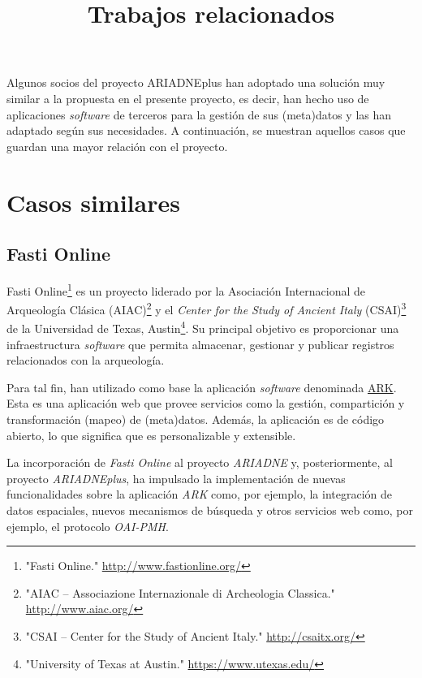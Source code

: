 \documentclass[
]{article}
\title{Trabajos relacionados}
\author{}
\date{}
\begin{document}
\maketitle

Algunos socios del proyecto ARIADNEplus han adoptado una solución muy
similar a la propuesta en el presente proyecto, es decir, han hecho uso
de aplicaciones \emph{software} de terceros para la gestión de sus
(meta)datos y las han adaptado según sus necesidades. A continuación, se
muestran aquellos casos que guardan una mayor relación con el proyecto.

\hypertarget{casos-similares}{%
\section{Casos similares}\label{casos-similares}}

\hypertarget{fasti-online}{%
\subsection{Fasti Online}\label{fasti-online}}

Fasti Online\footnote{"Fasti Online." \url{http://www.fastionline.org/}}
es un proyecto liderado por la Asociación Internacional de Arqueología
Clásica (AIAC)\footnote{"AIAC -- Associazione Internazionale di
  Archeologia Classica." \url{http://www.aiac.org/}} y el \emph{Center
for the Study of Ancient Italy} (CSAI)\footnote{"CSAI -- Center for the
  Study of Ancient Italy." \url{http://csaitx.org/}} de la Universidad
de Texas, Austin\footnote{"University of Texas at Austin."
  \url{https://www.utexas.edu/}}. Su principal objetivo es proporcionar
una infraestructura \emph{software} que permita almacenar, gestionar y
publicar registros relacionados con la arqueología.

Para tal fin, han utilizado como base la aplicación \emph{software}
denominada \href{https://ark.lparchaeology.com/}{ARK}. Esta es una
aplicación web que provee servicios como la gestión, compartición y
transformación (mapeo) de (meta)datos. Además, la aplicación es de
código abierto, lo que significa que es personalizable y extensible.

La incorporación de \emph{Fasti Online} al proyecto \emph{ARIADNE} y,
posteriormente, al proyecto \emph{ARIADNEplus}, ha impulsado la
implementación de nuevas funcionalidades sobre la aplicación \emph{ARK}
como, por ejemplo, la integración de datos espaciales, nuevos mecanismos
de búsqueda y otros servicios web como, por ejemplo, el protocolo
\emph{OAI-PMH}.
\end{document}
